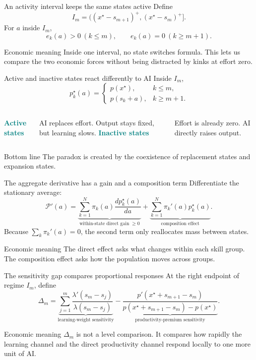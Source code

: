 \documentclass[aspectratio=169,11pt]{beamer}
\newcommand{\calP}{\mathcal{P}}
\newcommand{\key}[1]{\textcolor{teal}{\textbf{#1}}}
\newcommand{\econmeaning}[1]{%
  \begin{block}{Economic meaning}
  #1
  \end{block}}
\newcommand{\bottomline}[1]{%
  \begin{alertblock}{Bottom line}
  #1
  \end{alertblock}}
\begin{document}
\begin{frame}{An activity interval keeps the same states active}
Define
\[
\boxed{I_m=
\bigl((x^\star-s_{m+1})^+,(x^\star-s_m)^+\bigr].}
\]
For $a$ inside $I_m$,
\[
e_k(a)>0\ (k\le m),
\qquad
e_k(a)=0\ (k\ge m+1).
\]
\econmeaning{Inside one interval, no state switches formula. This lets us compare the two economic forces without being distracted by kinks at effort zero.}
\end{frame}

\begin{frame}{Active and inactive states react differently to AI}
Inside $I_m$,
\[
p_k^\star(a)=
\begin{cases}
p(x^\star), & k\le m,\\
p(s_k+a), & k\ge m+1.
\end{cases}
\]
\begin{columns}[T,onlytextwidth]
\key{Active states}

AI replaces effort. Output stays fixed, but learning slows.
\key{Inactive states}

Effort is already zero. AI directly raises output.
\end{columns}
\bottomline{The paradox is created by the coexistence of replacement states and expansion states.}
\end{frame}

\begin{frame}{The aggregate derivative has a gain and a composition term}
Differentiate the stationary average:
\[
\boxed{
\calP'(a)=
\underbrace{\sum_{k=1}^{N}\pi_k(a)\frac{d p_k^\star(a)}{da}}
_{\text{within-state direct gain }\ge0}
+
\underbrace{\sum_{k=1}^{N}\pi_k'(a)p_k^\star(a)}
_{\text{composition effect}}.}
\]
Because $\sum_k\pi_k'(a)=0$, the second term only reallocates mass between states.
\econmeaning{The direct effect asks what changes within each skill group. The composition effect asks how the population moves across groups.}
\end{frame}

\begin{frame}{The sensitivity gap compares proportional responses}
At the right endpoint of regime $I_m$, define
\[
\boxed{
\Delta_m=
\underbrace{\sum_{j=1}^{m}
\frac{\lambda'(s_m-s_j)}{\lambda(s_m-s_j)}}
_{\text{learning-weight sensitivity}}
-
\underbrace{
\frac{p'(x^\star+s_{m+1}-s_m)}
{p(x^\star+s_{m+1}-s_m)-p(x^\star)}}
_{\text{productivity-premium sensitivity}}.}
\]
\econmeaning{$\Delta_m$ is not a level comparison. It compares how rapidly the learning channel and the direct productivity channel respond locally to one more unit of AI.}
\end{frame}
\end{document}
